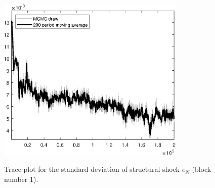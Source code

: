 \begin{figure}[H]
\centering
  \includegraphics[width=0.8\textwidth]{BRS_sectoral_rest/graphs/TracePlot_SE_e_N_blck_1}\\
    \caption{Trace plot for the standard deviation of structural shock ${e_N}$ (block number 1).}
\end{figure}
